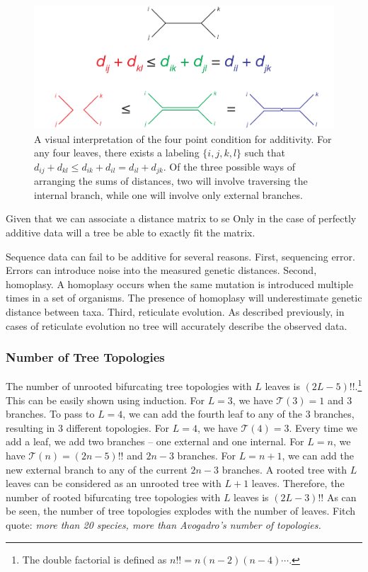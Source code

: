 \begin{figure}
\centering
\includegraphics[]{./fig/background/four_point_condition.pdf}
\caption[The four point condition for additivity]{A visual interpretation of the four point condition for additivity. For any four leaves, there exists a labeling $\{i,j,k,l\}$ such that $d_{ij}+d_{kl}\leq d_{ik}+d_{il} = d_{il}+d_{jk}$. Of the three possible ways of arranging the sums of distances, two will involve traversing the internal branch, while one will involve only external branches.}
\label{background:fig:four_point_condition}
\end{figure}

Given that we can associate a distance matrix to se
Only in the case of perfectly additive data will a tree be able to exactly fit the matrix.

Sequence data can fail to be additive for several reasons.
First, sequencing error.
Errors can introduce noise into the measured genetic distances.
Second, homoplasy.
A homoplasy occurs when the same mutation is introduced multiple times in a set of organisms.
The presence of homoplasy will underestimate genetic distance between taxa.
Third, reticulate evolution.
As described previously, in cases of reticulate evolution no tree will accurately describe the observed data.

\subsubsection{Number of Tree Topologies}

The number of unrooted bifurcating tree topologies with $L$ leaves is $(2L-5)!!$.\footnote{The double factorial is defined as $n!!=n(n-2)(n-4)\cdots$.}
This can be easily shown using induction.
For $L=3$, we have $\mathcal{T}(3)=1$ and $3$ branches.
To pass to $L=4$, we can add the fourth leaf to any of the $3$ branches, resulting in $3$ different topologies.
For $L=4$, we have $\mathcal{T}(4)=3$.
Every time we add a leaf, we add two branches -- one external and one internal.
For $L=n$, we have $\mathcal{T}(n)=(2n-5)!!$ and $2n-3$ branches.
For $L=n+1$, we can add the new external branch to any of the current $2n-3$ branches.
A rooted tree with $L$ leaves can be considered as an unrooted tree with $L+1$ leaves.
Therefore, the number of rooted bifurcating tree topologies with $L$ leaves is $(2L-3)!!$
As can be seen, the number of tree topologies explodes with the number of leaves.
Fitch quote: \emph{more than 20 species, more than Avogadro's number of topologies.}

